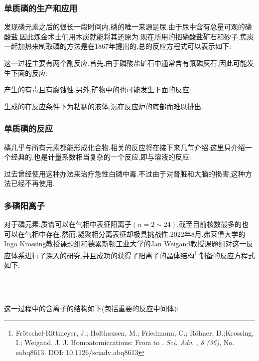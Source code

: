 \documentclass{ctexart}
\begin{document}
\subsubsection{单质磷的生产和应用}
发现磷元素之后的很长一段时间内,磷的唯一来源是尿.由于尿中含有总量可观的磷酸盐,因此炼金术士们用木炭就能将其还原为.现在所用的把磷酸盐矿石和砂子,焦炭一起加热来制取磷的方法是在1867年提出的,总的反应方程式可以表示如下:
\begin{center}
\end{center}
这一过程主要有两个副反应.首先,由于磷酸盐矿石中通常含有氟磷灰石,因此可能发生下面的反应:
\begin{center}
\end{center}
产生的有毒且有腐蚀性.另外,矿物中的也可能发生下面的反应:
\begin{center}
\end{center}
生成的在反应条件下为粘稠的液体,沉在反应炉的底部而难以排出.
\subsubsection{单质磷的反应}
磷几乎与所有元素都能形成化合物.相关的反应将在接下来几节介绍.这里只介绍一个经典的,也是计量系数相当复杂的一个反应,即与溶液的反应:
\begin{center}
\end{center}
过去曾经使用这种办法来治疗急性白磷中毒.不过由于对肾脏和大脑的损害,这种方法已经不再使用.
\subsubsection{多磷阳离子}
对于磷元素,质谱可以在气相中表征阳离子\ce{[Pn]+}$(n=2\sim24)$,截至目前核数最多的\ce{[P91]+}也可以在气相中存在.然而,凝聚相分离表征\ce{[Pn]+}却极具挑战性.2022年8月,弗莱堡大学的Ingo Krossing教授课题组和德累斯顿工业大学的Jan Weigand教授课题组对这一反应体系进行了深入的研究,并且成功的获得了\ce{[P9]+}阳离子的晶体结构\footnote{Frötschel-Rittmeyer, J.; Holthausen, M.; Friedmann, C.; Röhner, D.;Krossing,  I.; Weigand, J. J. Homoatomiccations: From \ce{[P5]+} to \ce{[P9]+}. \textit{Sci. Adv.} , \textit{8 (36)}, No. eabq8613. DOI: 10.1126/sciadv.abq8613}.制备的反应方程式如下:
\begin{center}
    \\
    \\
\end{center}
这一过程中的含离子的结构如下(包括重要的反应中间体\ce{[P5]+}):
\end{document}
